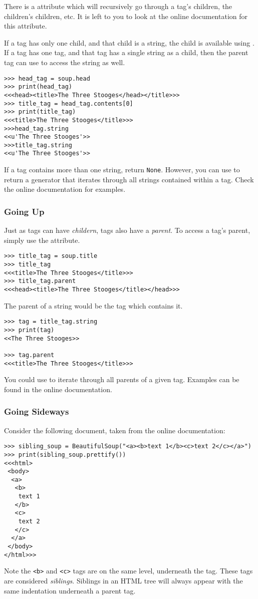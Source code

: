 There is a  attribute which will recursively go through a tag's children, the children's children, etc.
It is left to you to look at the online documentation for this attribute.

If a tag has only one child, and that child is a string, the child is available using .
If a tag has one tag, and that tag has a single string as a child, then the parent tag can use  to access the string as well.
\begin{lstlisting}
>>> head_tag = soup.head
>>> print(head_tag)
<<<head><title>The Three Stooges</head></title>>>
>>> title_tag = head_tag.contents[0]
>>> print(title_tag)
<<<title>The Three Stooges</title>>>
>>>head_tag.string
<<u'The Three Stooges'>>
>>>title_tag.string
<<u'The Three Stooges'>>
\end{lstlisting}
If a tag contains more than one string,  return \lstinline{None}.
However, you can use  to return a generator that iterates through all strings contained within a tag.
Check the online documentation for examples.

\subsubsection{Going Up}

Just as tags can have \textit{childern}, tags also have a \textit{parent}.
To access a tag's parent, simply use the  attribute.
\begin{lstlisting}
>>> title_tag = soup.title
>>> title_tag
<<<title>The Three Stooges</title>>>
>>> title_tag.parent
<<<head><title>The Three Stooges</title></head>>>
\end{lstlisting}
The parent of a string would be the tag which contains it.
\begin{lstlisting}
>>> tag = title_tag.string
>>> print(tag)
<<The Three Stooges>>

>>> tag.parent
<<<title>The Three Stooges</title>>>
\end{lstlisting}
You could use  to iterate through all parents of a given tag. Examples can be found in the online documentation.

\subsubsection{Going Sideways}

Consider the following document, taken from the online documentation:
\begin{lstlisting}
>>> sibling_soup = BeautifulSoup("<a><b>text 1</b><c>text 2</c></a>")
>>> print(sibling_soup.prettify())
<<<html>
 <body>
  <a>
   <b>
    text 1
   </b>
   <c>
    text 2
   </c>
  </a>
 </body>
</html>>>
\end{lstlisting}
Note the \lstinline{<b>} and \lstinline{<c>} tags are on the same level, underneath the  tag.
These tags are considered \textit{siblings}.
Siblings in an HTML tree will always appear with the same indentation underneath a parent tag.

